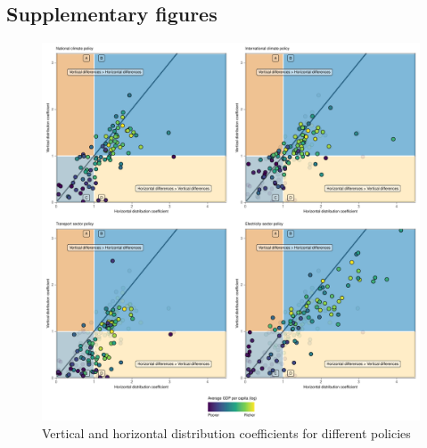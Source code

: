 \documentclass[12pt, a4paper]{article}
\newenvironment{subcaption2}
{\strut
\vspace{-5pt}
\begin{minipage}[b]{0.95\textwidth}
  \hspace*{-\parindent}
  \footnotesize}
 {\end{minipage}}
\begin{document}
\begin{refsection}
\section{Supplementary figures} \label{sec:figures}




\clearpage


\clearpage


\clearpage


\clearpage

\begin{figure}[ht!]
    \centering
    \includegraphics[width=\textwidth]{1_Figures/Figure 2/Figure_2_2017_Policy_B.pdf}
    \caption{Vertical and horizontal distribution coefficients for different policies}
    \label{fig:comparison_policies}
    \begin{subcaption2}

\end{subcaption2}
\end{figure}
\end{refsection}
\end{document}
